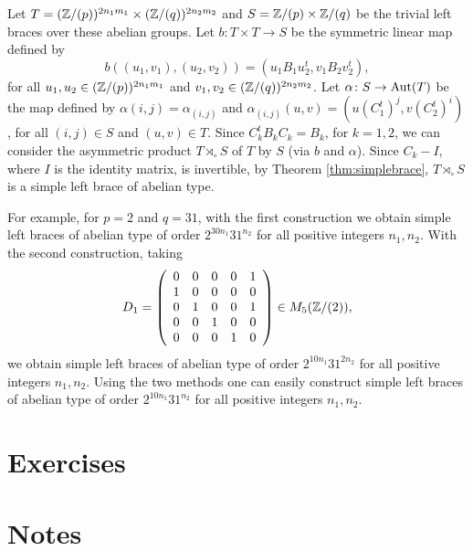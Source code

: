 Let $T=(\mathbb{Z}/(p))^{2n_1m_1}\times (\mathbb{Z}/(q))^{2n_2m_2}$ and $S=\mathbb{Z}/(p)\times\mathbb{Z}/(q)$ be the trivial left braces over these abelian groups.
Let $b\colon T\times T\rightarrow S$ be the symmetric linear map defined by
$$b((u_1,v_1),(u_2,v_2))=(u_1B_1u_2^t,v_1B_2v_2^t),$$
for all $u_1,u_2\in (\mathbb{Z}/(p))^{2n_1m_1}$ and $v_1,v_2\in (\mathbb{Z}/(q))^{2n_2m_2}$.
Let $\alpha\colon S\rightarrow \operatorname{Aut}(T)$ be the map defined by $\alpha(i,j)=\alpha_{(i,j)}$ and $\alpha_{(i,j)}(u,v)=(u(C_1^{t})^j,v(C_2^t)^{i})$, for all $(i,j)\in S$ and $(u,v)\in T$. Since $C_k^tB_kC_k=B_k$, for $k=1,2$, we can consider the asymmetric product $T\rtimes_{\circ}S$ of $T$ by $S$ (via $b$ and $\alpha$). Since $C_k-I$, where $I$ is the identity matrix, is invertible, by Theorem \ref{thm:simplebrace}, $T\rtimes_{\circ}S$ is a simple left brace of abelian type. 

For example, for $p=2$ and $q=31$, with the first construction we obtain simple left braces of abelian type of order $2^{30n_1}31^{n_2}$ for all positive integers $n_1,n_2$. With the second construction, taking
$$D_1=\left(\begin{array}{ccccc}
0&0&0&0&1\\
1&0&0&0&0\\
0&1&0&0&1\\
0&0&1&0&0\\
0&0&0&1&0\end{array}\right)\in M_5(\mathbb{Z}/(2)),$$
we obtain simple left braces of abelian type of order $2^{10n_1}31^{2n_2}$ for all positive integers $n_1,n_2$. Using the two methods one can easily construct simple left braces of abelian type of order $2^{10n_1}31^{n_2}$ for all positive integers $n_1,n_2$.



\section*{Exercises}

\begin{prob}
\end{prob}

\begin{prob}
\end{prob}


\begin{prob}
\end{prob}

\begin{prob}
\end{prob}


\section*{Notes}

